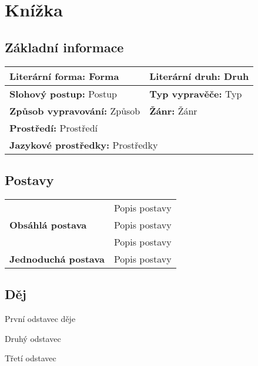 \section{Knížka}
\subsection*{Základní informace}
\begin{tabularx}{\linewidth}{l|l}
    \textbf{Literární forma:} Forma     & \textbf{Literární druh:} Druh \\
    \hline
    \textbf{Slohový postup:} Postup     & \textbf{Typ vypravěče:} Typ   \\
    \hline
    \textbf{Způsob vypravování:} Způsob & \textbf{Žánr:} Žánr           \\
    \hline
    \multicolumn{2}{l}{\textbf{Prostředí:} Prostředí}                   \\
    \hline
    \multicolumn{2}{l}{\textbf{Jazykové prostředky:} Prostředky}        \\
\end{tabularx}
\subsection*{Postavy}
\begin{tabularx}{\linewidth}{l|l}
    \multirow{3}{15em}{\textbf{Obsáhlá postava}} & Popis postavy \\
                                                 & Popis postavy \\
                                                 & Popis postavy \\
    \hline
    \textbf{Jednoduchá postava}                  & Popis postavy \\
\end{tabularx}
\subsection*{Děj}
První odstavec děje

Druhý odstavec

Třetí odstavec
